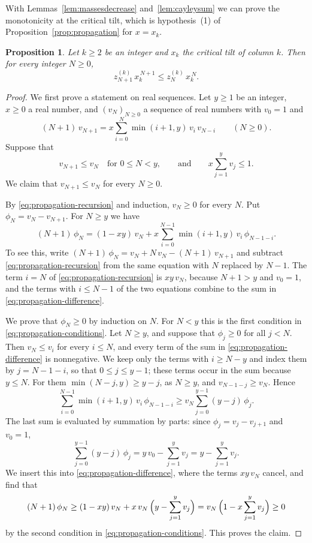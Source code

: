 \documentclass{amsart}
\newtheorem{proposition}[theorem]{Proposition}
\theoremstyle{definition}
\theoremstyle{remark}
\numberwithin{equation}{section}
\begin{document}
With Lemmas~\ref{lem:massesdecrease} and~\ref{lem:cayleysum} we can prove
the monotonicity at the critical tilt, which is hypothesis~(1) of
Proposition~\ref{prop:propagation} for $x=x_k$.

\begin{proposition}\label{prop:tilteddecrease}
Let $k\ge2$ be an integer and $x_k$ the critical tilt of column $k$. Then for
every integer $N\ge0$,
\[
z^{(k)}_{N+1}\,x_k^{\,N+1}\le z^{(k)}_N\,x_k^{\,N} .
\]
\end{proposition}

\begin{proof}
We first prove a statement on real sequences. Let $y\ge1$ be an integer,
$x\ge0$ a real number, and $(v_N)_{N\ge0}$ a sequence of real numbers with
$v_0=1$ and
\begin{equation}\label{eq:propagation-recursion}
(N+1)\,v_{N+1}=x\sum_{i=0}^{N}\min(i+1,y)\,v_i\,v_{N-i}\qquad(N\ge0).
\end{equation}
Suppose that
\begin{equation}\label{eq:propagation-conditions}
v_{N+1}\le v_N\quad\text{for }0\le N<y,
\qquad\text{and}\qquad x\sum_{j=1}^{y}v_j\le1 .
\end{equation}
We claim that $v_{N+1}\le v_N$ for every $N\ge0$.

By \eqref{eq:propagation-recursion} and induction, $v_N\ge0$ for every $N$.
Put $\phi_N=v_N-v_{N+1}$. For $N\ge y$ we have
\begin{equation}\label{eq:propagation-difference}
(N+1)\,\phi_N=(1-xy)\,v_N
+x\sum_{i=0}^{N-1}\min(i+1,y)\,v_i\,\phi_{N-1-i} .
\end{equation}
To see this, write $(N+1)\,\phi_N=v_N+N\,v_N-(N+1)\,v_{N+1}$ and subtract
\eqref{eq:propagation-recursion} from the same equation with $N$ replaced by
$N-1$. The term $i=N$ of \eqref{eq:propagation-recursion} is $xy\,v_N$,
because $N+1>y$ and $v_0=1$, and the terms with $i\le N-1$ of the two
equations combine to the sum in \eqref{eq:propagation-difference}.

We prove that $\phi_N\ge0$ by induction on $N$. For $N<y$ this is the first
condition in \eqref{eq:propagation-conditions}. Let $N\ge y$, and suppose
that $\phi_j\ge0$ for all $j<N$. Then $v_N\le v_i$ for every $i\le N$, and
every term of the sum in \eqref{eq:propagation-difference} is nonnegative. We
keep only the terms with $i\ge N-y$ and index them by $j=N-1-i$, so that
$0\le j\le y-1$; these terms occur in the sum because $y\le N$. For them
$\min(N-j,y)\ge y-j$, as $N\ge y$, and $v_{N-1-j}\ge v_N$. Hence
\[
\sum_{i=0}^{N-1}\min(i+1,y)\,v_i\,\phi_{N-1-i}
\ge v_N\sum_{j=0}^{y-1}(y-j)\,\phi_j .
\]
The last sum is evaluated by summation by parts: since
$\phi_j=v_j-v_{j+1}$ and $v_0=1$,
\[
\sum_{j=0}^{y-1}(y-j)\,\phi_j=y\,v_0-\sum_{j=1}^{y}v_j
=y-\sum_{j=1}^{y}v_j .
\]
We insert this into \eqref{eq:propagation-difference}, where the terms
$xy\,v_N$ cancel, and find that
\[
(N+1)\,\phi_N\ge(1-xy)\,v_N+x\,v_N\,\Bigl(y-\sum_{j=1}^{y}v_j\Bigr)
=v_N\,\Bigl(1-x\sum_{j=1}^{y}v_j\Bigr)\ge0
\]
by the second condition in \eqref{eq:propagation-conditions}. This proves the
claim.


\end{proof}
\end{document}
